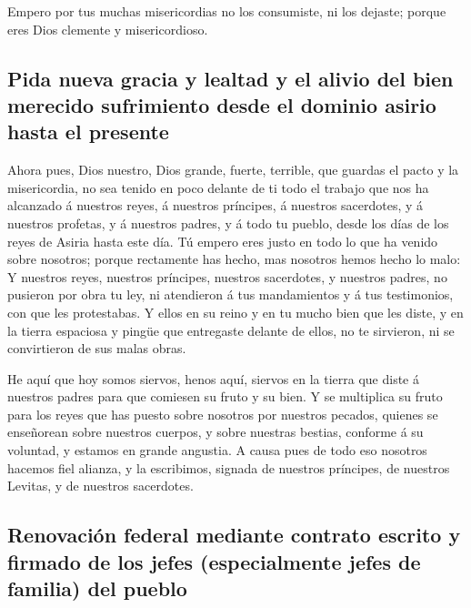  Empero por tus muchas misericordias no los consumiste,
ni los dejaste; porque eres Dios clemente y misericordioso.

\hypertarget{pida-nueva-gracia-y-lealtad-y-el-alivio-del-bien-merecido-sufrimiento-desde-el-dominio-asirio-hasta-el-presente}{%
\subsection{Pida nueva gracia y lealtad y el alivio del bien merecido
sufrimiento desde el dominio asirio hasta el
presente}\label{pida-nueva-gracia-y-lealtad-y-el-alivio-del-bien-merecido-sufrimiento-desde-el-dominio-asirio-hasta-el-presente}}

 Ahora pues, Dios nuestro, Dios grande, fuerte, terrible,
que guardas el pacto y la misericordia, no sea tenido en poco delante de
ti todo el trabajo que nos ha alcanzado á nuestros reyes, á nuestros
príncipes, á nuestros sacerdotes, y á nuestros profetas, y á nuestros
padres, y á todo tu pueblo, desde los días de los reyes de Asiria hasta
este día.  Tú empero eres justo en todo lo que ha venido
sobre nosotros; porque rectamente has hecho, mas nosotros hemos hecho lo
malo:  Y nuestros reyes, nuestros príncipes, nuestros
sacerdotes, y nuestros padres, no pusieron por obra tu ley, ni
atendieron á tus mandamientos y á tus testimonios, con que les
protestabas.  Y ellos en su reino y en tu mucho bien que
les diste, y en la tierra espaciosa y pingüe que entregaste delante de
ellos, no te sirvieron, ni se convirtieron de sus malas obras.

 He aquí que hoy somos siervos, henos aquí, siervos en la
tierra que diste á nuestros padres para que comiesen su fruto y su bien.
 Y se multiplica su fruto para los reyes que has puesto
sobre nosotros por nuestros pecados, quienes se enseñorean sobre
nuestros cuerpos, y sobre nuestras bestias, conforme á su voluntad, y
estamos en grande angustia.  A causa pues de todo eso
nosotros hacemos fiel alianza, y la escribimos, signada de nuestros
príncipes, de nuestros Levitas, y de nuestros sacerdotes.

\hypertarget{renovaciuxf3n-federal-mediante-contrato-escrito-y-firmado-de-los-jefes-especialmente-jefes-de-familia-del-pueblo}{%
\subsection{Renovación federal mediante contrato escrito y firmado de
los jefes (especialmente jefes de familia) del
pueblo}\label{renovaciuxf3n-federal-mediante-contrato-escrito-y-firmado-de-los-jefes-especialmente-jefes-de-familia-del-pueblo}}

